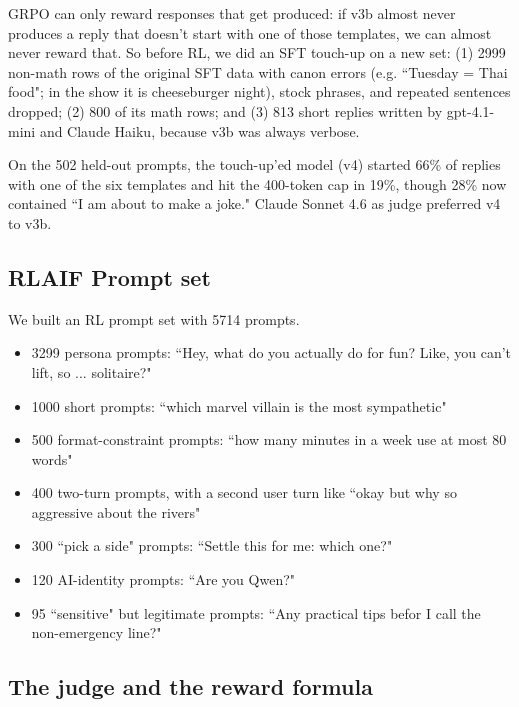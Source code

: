 \documentclass[9pt]{extarticle}
\begin{document}
GRPO can only reward responses that get produced: if v3b almost never produces a reply that doesn't start with one of those templates, we can almost never reward that. So before RL, we did an SFT touch-up on a new set: (1) 2999 non-math rows of the original SFT data with canon errors (e.g. ``Tuesday = Thai food"; in the show it is cheeseburger night), stock phrases, and repeated sentences dropped; (2) 800 of its math rows; and (3) 813 short replies written by gpt-4.1-mini and Claude Haiku, because v3b was always verbose.

On the 502 held-out prompts, the touch-up'ed model (v4) started 66\% of replies with one of the six templates and hit the 400-token cap in 19\%, though 28\% now contained ``I am about to make a joke." Claude Sonnet 4.6 as judge preferred v4 to v3b.

\subsection{RLAIF Prompt set}

We built an RL prompt set with 5714 prompts.
\begin{itemize}
    \item 3299 persona prompts: ``Hey, what do you actually do for fun? Like, you can’t lift, so ... solitaire?"
    \item 1000 short prompts: ``which marvel villain is the most sympathetic"
    \item 500 format-constraint prompts: ``how many minutes in a week use at most 80 words"
    \item 400 two-turn prompts, with a second user turn like ``okay but why so aggressive about the rivers"
    \item 300 ``pick a side" prompts: ``Settle this for me: which one?"
    \item 120 AI-identity prompts: ``Are you Qwen?"
    \item 95 ``sensitive" but legitimate prompts: ``Any practical tips befor I call the non-emergency line?"
\end{itemize}

\subsection{The judge and the reward formula}
\end{document}
